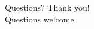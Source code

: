 \documentclass[11pt]{beamer}
\begin{document}
\begin{frame}{Questions?}
  \centering
  \Huge Thank you! \\
  \vspace{1cm}
  \Large Questions welcome.
\end{frame}
\end{document}

